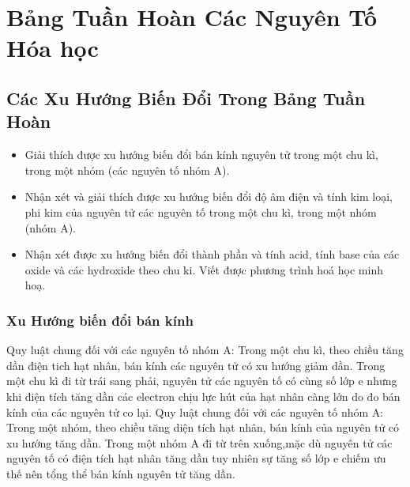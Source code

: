 \chapter{Bảng Tuần Hoàn Các Nguyên Tố Hóa học}
\section{Các Xu Hướng Biến Đổi Trong Bảng Tuần Hoàn}
\begin{mtbh}
	\begin{itemize}
		\item Giải thích được xu hướng biến đổi bán kính nguyên tử trong một chu kì, trong một nhóm (các nguyên tố nhóm A).
		\item Nhận xét và giải thích được xu hướng biến đổi độ âm điện và tính kim loại, phi kim của nguyên tử các nguyên tố trong một chu kì, trong một nhóm (nhóm A).
		\item Nhận xét được xu hướng biến đổi thành phần và tính acid, tính base của các oxide và các hydroxide theo chu ki. Viết được phương trình hoá học minh hoạ.
	\end{itemize}
\end{mtbh}
\subsection{Xu Hướng biến đổi bán kính}
\begin{hoplythuyet}
		Quy luật chung đối với các nguyên tố nhóm A: Trong một chu kì, theo chiều tăng dần điện tich hạt nhân, bán kính các nguyên tử có xu hướng giảm dần.
	Trong một chu kì đi từ trái sang phải, nguyên tử các nguyên tố có cùng số lớp e nhưng khi điện tích tăng dần các electron chịu lực hút của hạt nhân càng lớn do đo bán kính của các nguyên tử co lại.
	Quy luật chung đối với các nguyên tố nhóm A: Trong một nhóm, theo chiều tăng diện tích hạt nhân, bán kính của nguyên tử có xu hướng tăng dần.
	Trong một nhóm A đi từ trên xuống,mặc dù nguyên tử các nguyên tố có điện tích hạt nhân tăng dần tuy nhiên sự tăng số lớp e chiếm ưu thế nên tổng thể bán kính nguyên tử tăng dần.
\end{hoplythuyet}
